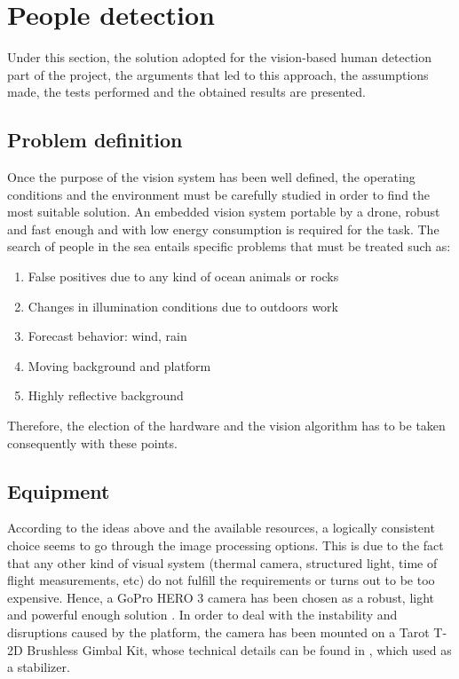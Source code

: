\chapter{People detection}
Under this section, the solution adopted for the vision-based human detection part of the project, the arguments that led to this approach, the assumptions made, the tests performed and the obtained results are presented. 

\section{Problem definition}
Once the purpose of the vision system has been well defined, the operating conditions and the environment must be carefully studied in order to find the most suitable solution.
An embedded vision system portable by a drone, robust and fast enough and with low energy consumption is required for the task. 
The search of people in the sea entails specific problems that must be treated such as:

\begin{enumerate}[itemsep=1mm,topsep=1mm,leftmargin=.35in]
    \label{list: problem_def}
    \item False positives due to any kind of ocean animals or rocks
    \item Changes in illumination conditions due to outdoors work
    \item Forecast behavior: wind, rain
    \item Moving background and platform
    \item Highly reflective background
\end{enumerate}%

Therefore, the election of the hardware and the vision algorithm has to be taken consequently with these points.

\section{Equipment}
According to the ideas above and the available resources, a logically consistent choice seems to go through the image processing options. 
This is due to the fact that any other kind of visual system (thermal camera, structured light, time of flight measurements, etc) do not fulfill the requirements or turns out to be too expensive.
Hence, a GoPro HERO 3 camera has been chosen as a robust, light and powerful enough solution \cite{ref:GoPro}.
In order to deal with the instability and disruptions caused by the platform, the camera has been mounted on a Tarot T-2D Brushless Gimbal Kit, whose technical details can be found in \cite{Ref:Gimbal}, which used as a stabilizer.

